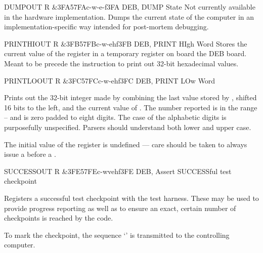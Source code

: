 \begin{extcmd}{DUMP}{OUT R \&3FA}{57FA}{c-w-e-f}{3FA}%
       {DEB, DUMP State}%
       {%
         Not currently available in the hardware implementation. Dumps the
         current state of the computer in an implementation-specific way
         intended for post-mortem debugging.
}
\end{extcmd}

\begin{extcmd}{PRINTHI}{OUT R \&3FB}{57FB}{c-w-ehf}{3FB}%
       {DEB, PRINT HIgh Word}%
       {%
         Stores the current value of the \A{} register in a temporary register
         on board the \gls{DEB} board. Meant to be precede the
          instruction to print out 32-bit hexadecimal values.}
\end{extcmd}

\begin{extcmd}{PRINTLO}{OUT R \&3FC}{57FC}{c-w-ehf}{3FC}%
       {DEB, PRINT LOw Word}%
       {%
         Prints out the 32-bit integer made by combining the last value stored
         by , shifted 16 bits to the left, and the current value
         of \A{}. The number reported is in the range
         – and is zero padded to eight digits. The
         case of the alphabetic digits is purposefully unspecified. Parsers
         should understand both lower and upper case.

         The initial value of the  register is undefined — care
         should be taken to always issue a  before a
         .
       }
\end{extcmd}

\begin{extcmd}{SUCCESS}{OUT R \&3FE}{57FE}{c-wvehf}{3FE}%
       {DEB, Assert SUCCESSful test checkpoint}%
       {%
         Registers a successful test checkpoint with the test harness. These
         may be used to provide progress reporting as well as to ensure an
         exact, certain number of checkpoints is reached by the code.

         To mark the checkpoint, the sequence ‘\cftout{[ok]}’ is transmitted to
         the controlling computer.
       }
\end{extcmd}


